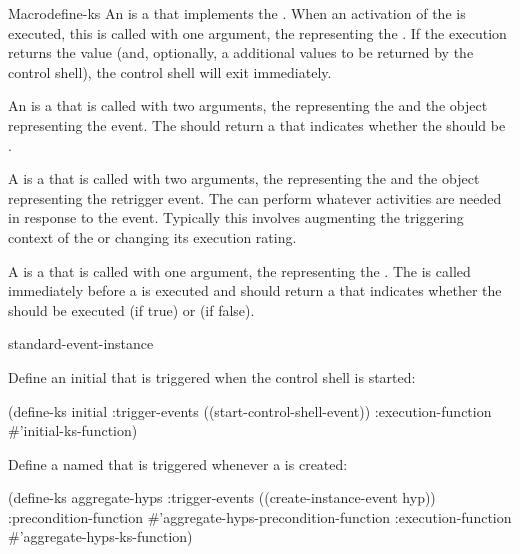 \documentclass[10pt,twoside,english,pdftex]{article}
\begin{document}
\begin{functiondoc}{Macro}{define-ks}
An  is a  that implements the
.  When an activation of the  is executed, this
 is called with one argument, the 
representing the . If the execution  returns the value
 (and, optionally, a additional values to be returned by the
control shell), the control shell will exit immediately.

An  is a  that is called with two
arguments, the  representing the  and the
object representing the  event.  The
 should return a 
that indicates whether the  should be .

A  is a  that is called with two
arguments, the  representing the  and the
object representing the retrigger event.  The
 can perform whatever activities are needed
in response to the event.  Typically this involves augmenting the triggering
context of the  or changing its execution rating.

A  is a  that is called with one
argument, the  representing the .  The
 is called immediately before a
 is executed and should return a  that
indicates whether the  should be executed (if true) or
 (if false).

\begin{alsos}{standard-event-instance}
\also[describe-ks]
\also[ensure-ks]
\also[ks]
\also[ks-enabled-p]
\also[undefine-ks]
\end{alsos}

\fnexamples
Define an initial  that is triggered when the control shell is started:
%
\W\supp
\begin{example}
  (define-ks initial
     :trigger-events ((start-control-shell-event)) 
     :execution-function #'initial-ks-function)
\end{example}

Define a  named  that is triggered
whenever a   is created:
%
\W\supp
\begin{example}
  (define-ks aggregate-hyps
     :trigger-events ((create-instance-event hyp))
     :precondition-function #'aggregate-hyps-precondition-function
     :execution-function #'aggregate-hyps-ks-function)
\end{example}

\fnnote
\instancekstriggersnyi

\end{functiondoc}
\end{document}
